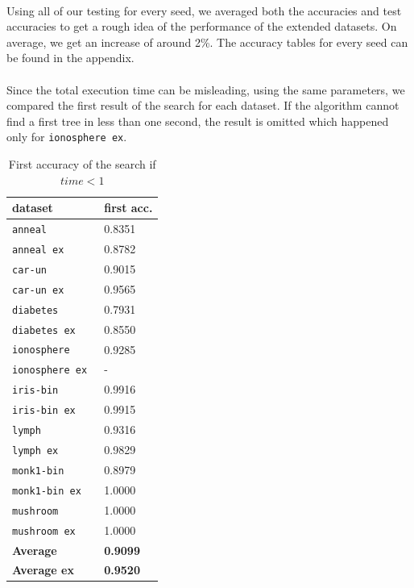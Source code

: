 \documentclass[12pt]{report}
\theoremstyle{definition}
\theoremstyle{definition}
\theoremstyle{definition}
\begin{document}
\paragraph{} Using all of our testing for every seed, we averaged both the accuracies and test accuracies to get a rough idea
of the performance of the extended datasets. On average, we get an increase of around 2\%. The accuracy tables for every
seed can be found in the appendix.

\newpage

\paragraph{} Since the total execution time can be misleading, using the same parameters, we compared the first result
of the search for each dataset. If the algorithm cannot find a first tree in less than one second, the result is
omitted which happened only for \texttt{ionosphere ex}.

\begin{table}[ht]
    \centering
    \begin{tabular}{L{3.5cm} R{1.8cm}}
        \hline
        \bf dataset & \bf first acc. \\
        \hline
        \tt anneal & 0.8351 \\
        \tt anneal ex & 0.8782 \\
        \tt car-un & 0.9015 \\
        \tt car-un ex & 0.9565 \\
        \tt diabetes & 0.7931 \\
        \tt diabetes ex & 0.8550 \\
        \tt ionosphere & 0.9285 \\
        \tt ionosphere ex & - \\
        \tt iris-bin & 0.9916 \\
        \tt iris-bin ex & 0.9915 \\
        \tt lymph & 0.9316 \\
        \tt lymph ex & 0.9829 \\
        \tt monk1-bin & 0.8979 \\
        \tt monk1-bin ex & 1.0000 \\
        \tt mushroom & 1.0000 \\
        \tt mushroom ex & 1.0000 \\
        \hline
        \bf Average & \bf 0.9099 \\
        \hline
        \bf Average ex & \bf 0.9520 \\
        \hline
    \end{tabular}
    \caption{First accuracy of the search if $time<1$}
    \label{fig:firstacc}
\end{table}
\end{document}
